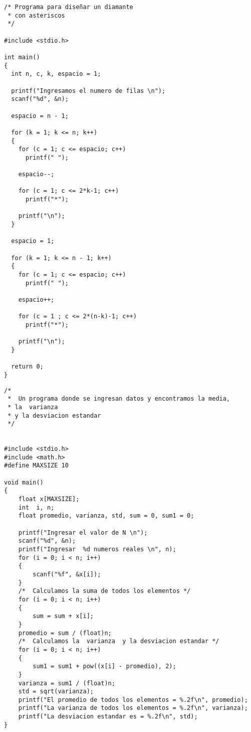 \documentclass[twoside,10.5pt]{article}%
\begin{document}
\vspace{0.3cm}


\begin{verbatim}
/* Programa para diseñar un diamante
 * con asteriscos 
 */

#include <stdio.h>
 
int main()
{
  int n, c, k, espacio = 1;
 
  printf("Ingresamos el numero de filas \n");
  scanf("%d", &n);
 
  espacio = n - 1;
 
  for (k = 1; k <= n; k++)
  {
    for (c = 1; c <= espacio; c++)
      printf(" ");
 
    espacio--;
 
    for (c = 1; c <= 2*k-1; c++)
      printf("*");
 
    printf("\n");
  }
 
  espacio = 1;
 
  for (k = 1; k <= n - 1; k++)
  {
    for (c = 1; c <= espacio; c++)
      printf(" ");
 
    espacio++;
 
    for (c = 1 ; c <= 2*(n-k)-1; c++)
      printf("*");
 
    printf("\n");
  }
 
  return 0;
}
\end{verbatim}

\vspace{0.3cm}

\begin{verbatim}
/*
 *  Un programa donde se ingresan datos y encontramos la media,
 * la  varianza
 * y la desviacion estandar 
 */


#include <stdio.h>
#include <math.h>
#define MAXSIZE 10
 
void main()
{
    float x[MAXSIZE];
    int  i, n;
    float promedio, varianza, std, sum = 0, sum1 = 0;
 
    printf("Ingresar el valor de N \n");
    scanf("%d", &n);
    printf("Ingresar  %d numeros reales \n", n);
    for (i = 0; i < n; i++)
    {
        scanf("%f", &x[i]);
    }
    /*  Calculamos la suma de todos los elementos */
    for (i = 0; i < n; i++)
    {
        sum = sum + x[i];
    }
    promedio = sum / (float)n;
    /*  Calculamos la  varianza  y la desviacion estandar */
    for (i = 0; i < n; i++)
    {
        sum1 = sum1 + pow((x[i] - promedio), 2);
    }
    varianza = sum1 / (float)n;
    std = sqrt(varianza);
    printf("El promedio de todos los elementos = %.2f\n", promedio);
    printf("La varianza de todos los elementos = %.2f\n", varianza);
    printf("La desviacion estandar es = %.2f\n", std);
}

\end{verbatim}
\end{document}
